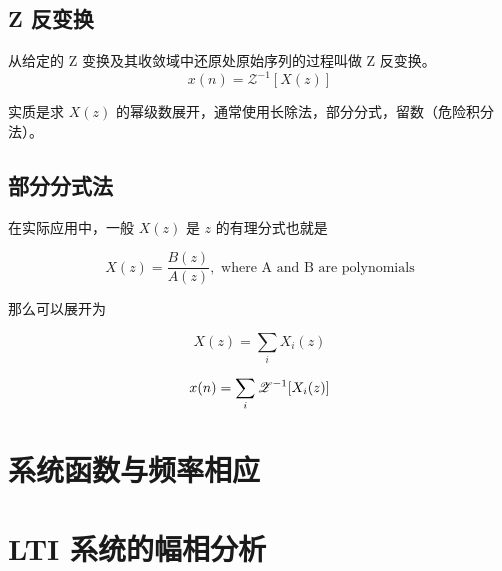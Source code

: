 \documentclass[cn,11pt,chinese,black,simple]{../elegantbook}
\begin{document}
\subsection{Z 反变换}

\begin{definition}[Z 反变换]
    从给定的 Z 变换及其收敛域中还原处原始序列的过程叫做 Z 反变换。
    \[x(n) = \mathscr{Z}^{-1}[X(z)]\]

    实质是求 \(X(z)\) 的幂级数展开，通常使用长除法，部分分式，留数（危险积分法）。
\end{definition}

\subsection*{部分分式法}

在实际应用中，一般 \(X(z)\) 是 \(z\) 的有理分式也就是

\[X(z) = \frac{B(z)}{A(z)}, \text{ where A and B are polynomials}\]

那么可以展开为 

\[X(z) = \sum_i X_i(z)\]

\[x(n) = \sum_i \mathscr{Z}^{-1}[X_i (z)]\]

\section{系统函数与频率相应}

\section{LTI 系统的幅相分析}

\let\chapname\undefined
\ifx\mainclass\undefined
\end{document}
